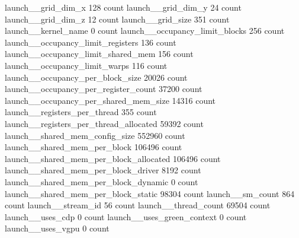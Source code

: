 launch__grid_dim_x                                                                           128 count
launch__grid_dim_y                                                                            24 count
launch__grid_dim_z                                                                            12 count
launch__grid_size                                                                            351 count
launch__kernel_name                                                                            0 count
launch__occupancy_limit_blocks                                                               256 count
launch__occupancy_limit_registers                                                            136 count
launch__occupancy_limit_shared_mem                                                           156 count
launch__occupancy_limit_warps                                                                116 count
launch__occupancy_per_block_size                                                           20026 count
launch__occupancy_per_register_count                                                       37200 count
launch__occupancy_per_shared_mem_size                                                      14316 count
launch__registers_per_thread                                                                 355 count
launch__registers_per_thread_allocated                                                     59392 count
launch__shared_mem_config_size                                                            552960 count
launch__shared_mem_per_block                                                              106496 count
launch__shared_mem_per_block_allocated                                                    106496 count
launch__shared_mem_per_block_driver                                                         8192 count
launch__shared_mem_per_block_dynamic                                                           0 count
launch__shared_mem_per_block_static                                                        98304 count
launch__sm_count                                                                             864 count
launch__stream_id                                                                             56 count
launch__thread_count                                                                       69504 count
launch__uses_cdp                                                                               0 count
launch__uses_green_context                                                                     0 count
launch__uses_vgpu                                                                              0 count

